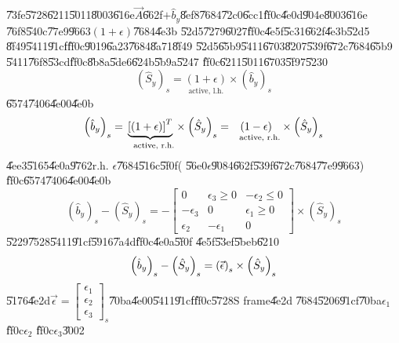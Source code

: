 \documentclass[12pt,a4paper]{article}
\begin{document}
\U{73fe}\U{5728}\U{6211}\U{5011}\U{8003}\U{616e}$\vec{A}$\U{662f}$+\hat{b}%
_{y}$\U{8ef8}\U{7684}\U{72c0}\U{6cc1}\U{ff0c}\U{4e0d}\U{904e}\U{8003}\U{616e}%
\U{76f8}\U{540c}\U{77e9}\U{9663}$\left( 1+\epsilon \right) $\U{7684}\U{4e3b}%
\U{52d5}\U{7279}\U{6027}\U{ff0c}\U{4e5f}\U{5c31}\U{662f}\U{4e3b}\U{52d5}%
\U{8f49}\U{5411}\U{91cf}\U{ff0c}\U{9019}\U{6a23}\U{7684}\U{8a71}\U{8f49}%
\U{52d5}\U{65b9}\U{5411}\U{6703}\U{8207}\U{539f}\U{672c}\U{7684}\U{65b9}%
\U{5411}\U{76f8}\U{53cd}\U{ff0c}\U{8b8a}\U{5de6}\U{624b}\U{5b9a}\U{5247}%
\U{ff0c}\U{6211}\U{5011}\U{6703}\U{5f97}\U{5230}%
\begin{equation*}
\left( \hat{S}_{y}\right) _{s}=\underset{\text{active, l.h.}}{\left(
1+\epsilon \right) }\times \left( \hat{b}_{y}\right) _{s}
\end{equation*}%
\U{6574}\U{7406}\U{4e00}\U{4e0b}%
\begin{equation*}
\left( \hat{b}_{y}\right) _{s}=\underset{\text{active, r.h.}}{\underbrace{%
\left[ \left( 1+\epsilon \right) \right] ^{T}}}\times \left( \hat{S}%
_{y}\right) _{s}=\underset{\text{active, r.h.}}{\left( 1-\epsilon \right) }%
\times \left( \hat{S}_{y}\right) _{s}
\end{equation*}%
\U{4ee3}\U{5165}\U{4e0a}\U{9762}r.h. $\epsilon $\U{7684}\U{516c}\U{5f0f}(%
\U{56e0}$\epsilon $\U{9084}\U{662f}\U{539f}\U{672c}\U{7684}\U{77e9}\U{9663})%
\U{ff0c}\U{6574}\U{7406}\U{4e00}\U{4e0b}%
\begin{equation*}
\left( \hat{b}_{y}\right) _{s}-\left( \hat{S}_{y}\right) _{s}=-\left[ 
\begin{array}{ccc}
0 & \epsilon _{3}\geq 0 & -\epsilon _{2}\leq 0 \\ 
-\epsilon _{3} & 0 & \epsilon _{1}\geq 0 \\ 
\epsilon _{2} & -\epsilon _{1} & 0%
\end{array}%
\right] \times \left( \hat{S}_{y}\right) _{s}
\end{equation*}%
\U{5229}\U{7528}\U{5411}\U{91cf}\U{5916}\U{7a4d}\U{ff0c}\U{4e0a}\U{5f0f}%
\U{4e5f}\U{53ef}\U{5beb}\U{6210}%
\begin{equation*}
\left( \hat{b}_{y}\right) _{s}-\left( \hat{S}_{y}\right) _{s}=\left( \vec{%
\epsilon}\right) _{s}\times \left( \hat{S}_{y}\right) _{s}
\end{equation*}%
\U{5176}\U{4e2d}$\vec{\epsilon}=\left[ 
\begin{array}{c}
\epsilon _{1} \\ 
\epsilon _{2} \\ 
\epsilon _{3}%
\end{array}%
\right] _{s}$\U{70ba}\U{4e00}\U{5411}\U{91cf}\U{ff0c}\U{5728}S frame\U{4e2d}%
\U{7684}\U{5206}\U{91cf}\U{70ba}$\epsilon _{1}$\U{ff0c}$\epsilon _{2}$%
\U{ff0c}$\epsilon _{3}$\U{3002}
\end{document}

